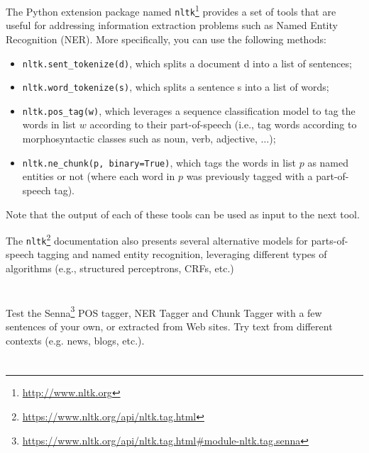 \documentclass[12pt]{article}
\begin{document}

The Python extension package named \verb+nltk+\footnote{\url{http://www.nltk.org}} provides a set of tools that are useful for addressing information extraction problems such as Named Entity Recognition (NER). More specifically, you can use the following methods:

\begin{itemize}
\item \verb+nltk.sent_tokenize(d)+, which splits a document d into a list of sentences;

\item \verb+nltk.word_tokenize(s)+, which splits a sentence s into a list of words;

\item \verb+nltk.pos_tag(w)+, which leverages a sequence classification model to tag the words in list $w$ according to their part-of-speech (i.e., tag words according to morphosyntactic classes such as noun, verb, adjective, $\ldots$);

\item \verb+nltk.ne_chunk(p, binary=True)+, which tags the words in list $p$ as named entities or not (where each word in $p$ was previously tagged with a part-of-speech tag).
\end{itemize}

Note that the output of each of these tools can be used as input to the next tool.

The \verb+nltk+\footnote{\url{https://www.nltk.org/api/nltk.tag.html}} documentation also presents several alternative models for parts-of-speech tagging and named entity recognition, leveraging different types of algorithms (e.g., structured perceptrons, CRFs, etc.)

\section{}

Test the Senna\footnote{\url{https://www.nltk.org/api/nltk.tag.html\#module-nltk.tag.senna}} POS tagger, NER Tagger and Chunk Tagger with a few sentences of your own, or extracted from Web sites. Try text from different contexts (e.g. news, blogs, etc.).

\section{}
\end{document}
